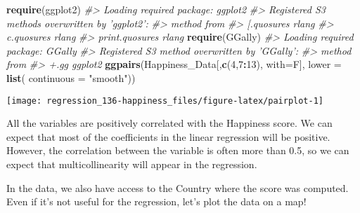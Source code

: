\documentclass[]{book}
\newenvironment{Shaded}{\begin{snugshade}}{\end{snugshade}}
\newcommand{\CommentTok}[1]{\textcolor[rgb]{0.56,0.35,0.01}{\textit{#1}}}
\newcommand{\DataTypeTok}[1]{\textcolor[rgb]{0.13,0.29,0.53}{#1}}
\newcommand{\DecValTok}[1]{\textcolor[rgb]{0.00,0.00,0.81}{#1}}
\newcommand{\KeywordTok}[1]{\textcolor[rgb]{0.13,0.29,0.53}{\textbf{#1}}}
\newcommand{\NormalTok}[1]{#1}
\newcommand{\OperatorTok}[1]{\textcolor[rgb]{0.81,0.36,0.00}{\textbf{#1}}}
\newcommand{\StringTok}[1]{\textcolor[rgb]{0.31,0.60,0.02}{#1}}
\begin{document}
\begin{Shaded}
\begin{Highlighting}[]
\KeywordTok{require}\NormalTok{(ggplot2)}
\CommentTok{#> Loading required package: ggplot2}
\CommentTok{#> Registered S3 methods overwritten by 'ggplot2':}
\CommentTok{#>   method         from }
\CommentTok{#>   [.quosures     rlang}
\CommentTok{#>   c.quosures     rlang}
\CommentTok{#>   print.quosures rlang}
\KeywordTok{require}\NormalTok{(GGally)}
\CommentTok{#> Loading required package: GGally}
\CommentTok{#> Registered S3 method overwritten by 'GGally':}
\CommentTok{#>   method from   }
\CommentTok{#>   +.gg   ggplot2}
\KeywordTok{ggpairs}\NormalTok{(Happiness_Data[,}\KeywordTok{c}\NormalTok{(}\DecValTok{4}\NormalTok{,}\DecValTok{7}\OperatorTok{:}\DecValTok{13}\NormalTok{), }\DataTypeTok{with=}\NormalTok{F], }\DataTypeTok{lower =} \KeywordTok{list}\NormalTok{( }\DataTypeTok{continuous =} \StringTok{"smooth"}\NormalTok{))}
\end{Highlighting}
\end{Shaded}

\begin{center}\texttt{[image: regression\_136-happiness\_files/figure-latex/pairplot-1]} \end{center}

All the variables are positively correlated with the Happiness score. We can expect that most of the coefficients in the linear regression will be positive. However, the correlation between the variable is often more than 0.5, so we can expect that multicollinearity will appear in the regression.

In the data, we also have access to the Country where the score was computed. Even if it's not useful for the regression, let's plot the data on a map!
\end{document}
